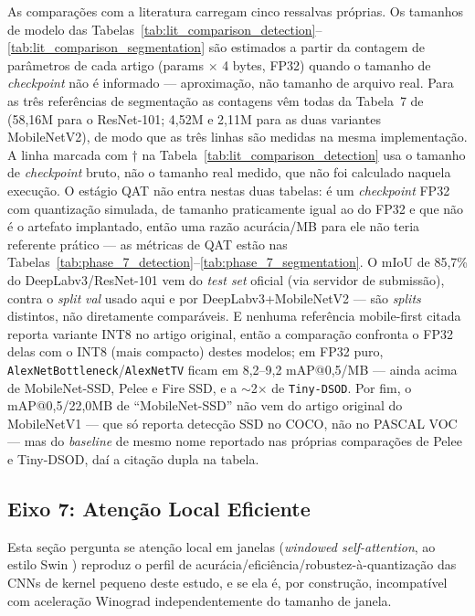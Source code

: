 \documentclass[conference]{IEEEtran}
\begin{document}
As comparações com a literatura carregam cinco ressalvas próprias. Os tamanhos de modelo das
Tabelas~\ref{tab:lit_comparison_detection}--\ref{tab:lit_comparison_segmentation} são estimados a
partir da contagem de parâmetros de cada artigo (params $\times$ 4 bytes, FP32) quando o tamanho de
\textit{checkpoint} não é informado — aproximação, não tamanho de arquivo real. Para as três
referências de segmentação as contagens vêm todas da Tabela~7 de \cite{sandler2018mobilenetv2}
(58,16M para o ResNet-101; 4,52M e 2,11M para as duas variantes MobileNetV2), de modo que as três
linhas são medidas na mesma implementação. A linha marcada com
$\dagger$ na Tabela~\ref{tab:lit_comparison_detection} usa o tamanho de \textit{checkpoint} bruto,
não o tamanho real medido, que não foi calculado naquela execução. O estágio QAT não entra nestas
duas tabelas: é um \textit{checkpoint} FP32 com quantização simulada, de tamanho praticamente igual
ao do FP32 e que não é o artefato implantado, então uma razão acurácia/MB para ele não teria
referente prático — as métricas de QAT estão nas
Tabelas~\ref{tab:phase_7_detection}--\ref{tab:phase_7_segmentation}. O mIoU de 85,7\% do
DeepLabv3/ResNet-101 vem do \textit{test set} oficial (via servidor de submissão), contra o
\textit{split} \textit{val} usado aqui e por DeepLabv3+MobileNetV2 — são \textit{splits} distintos,
não diretamente comparáveis. E nenhuma referência mobile-first citada reporta variante INT8 no
artigo original, então a comparação confronta o FP32 delas com o INT8 (mais compacto) destes
modelos; em FP32 puro, \texttt{AlexNetBottleneck}/\texttt{AlexNetTV} ficam em 8,2--9,2 mAP@0,5/MB —
ainda acima de MobileNet-SSD, Pelee e Fire SSD, e a $\sim$2$\times$ de \texttt{Tiny-DSOD}. Por fim, o
mAP@0,5/22,0MB de ``MobileNet-SSD'' não vem do artigo original do MobileNetV1 \cite{howard2017mobilenets}
— que só reporta detecção SSD no COCO, não no PASCAL VOC — mas do \textit{baseline} de mesmo nome
reportado nas próprias comparações de Pelee e Tiny-DSOD, daí a citação dupla na tabela.

\subsection{Eixo 7: Atenção Local Eficiente}
\label{sec:contrib7}

Esta seção pergunta se atenção local em janelas (\textit{windowed self-attention}, ao estilo Swin
\cite{liu2021swin}) reproduz o perfil de acurácia/eficiência/robustez-à-quantização das CNNs de
kernel pequeno deste estudo, e se ela é, por construção, incompatível com aceleração Winograd
independentemente do tamanho de janela.
\end{document}

